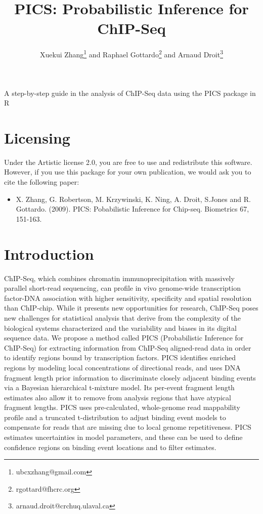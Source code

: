 \documentclass[a4paper]{article}
\author{Xuekui Zhang\footnote{ubcxzhang@gmail.com} and Raphael
  Gottardo\footnote{rgottard@fhcrc.org} and Arnaud Droit\footnote{arnaud.droit@crchuq.ulaval.ca}}
\begin{document}
\title{PICS: Probabilistic Inference for ChIP-Seq}
\maketitle



\textnormal {\normalfont}
A step-by-step guide in the analysis of ChIP-Seq data using the PICS package in R

\tableofcontents
\newpage


\section{Licensing}

Under the Artistic license 2.0, you are free to use and redistribute this software. However, if you use this package for your own publication, we would ask you to cite the following paper:

\begin{itemize}
\item[] X. Zhang, G. Robertson, M. Krzywinski, K. Ning, A. Droit, S.Jones and R. Gottardo. (2009). PICS: Pobabilistic Inference for Chip-seq. Biometrics 67, 151-163.
\end{itemize}


\section{Introduction}
ChIP-Seq, which combines chromatin immunoprecipitation with massively parallel
short-read sequencing, can profile in vivo genome-wide transcription
factor-DNA association with higher sensitivity, specificity and spatial
resolution than ChIP-chip. While it presents new opportunities for research,
ChIP-Seq poses new challenges for statistical analysis that derive from the
complexity of the biological systems characterized and the variability and
biases in its digital sequence data. We propose a method called PICS
(Probabilistic Inference for ChIP-Seq) for extracting information from
ChIP-Seq aligned-read data in order to identify regions bound by transcription
factors. PICS identifies enriched regions by modeling local concentrations of
directional reads, and uses DNA fragment length prior information to
discriminate closely adjacent binding events via a Bayesian hierarchical
t-mixture model. Its per-event fragment length estimates also allow it to
remove from analysis regions that have atypical fragment lengths. PICS uses
pre-calculated, whole-genome read mappability profile and a truncated
t-distribution to adjust binding event models to compensate for reads that are
missing due to local genome repetitiveness. PICS estimates uncertainties in
model parameters, and these can be used to define confidence regions on binding event locations and to filter estimates. 
\end{document}
